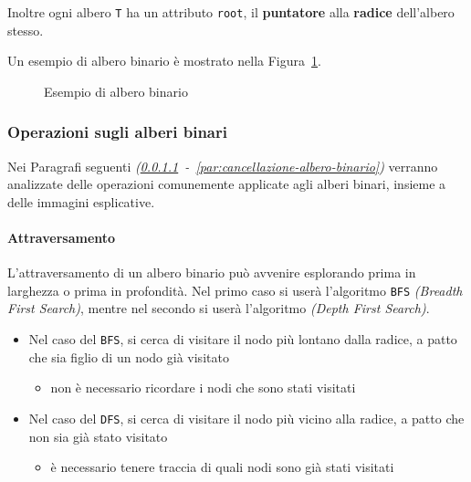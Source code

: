 \documentclass[italian, 10pt]{article}
\begin{document}
Inoltre ogni albero \texttt{T} ha un attributo \texttt{root}, il \textbf{puntatore} alla \textbf{radice} dell'albero stesso.

\bigskip
Un esempio di albero binario è mostrato nella Figura~\ref{fig:esempio-albero-binario}.

\begin{figure}[htbp]
  \bigskip
  \centering
  \caption{Esempio di albero binario}
  \label{fig:esempio-albero-binario}
  \bigskip
\end{figure}

\subsubsection{Operazioni sugli alberi binari}

Nei Paragrafi seguenti \textit{(\ref{attraversamento-albero-binario}~-~\ref{par:cancellazione-albero-binario})} verranno analizzate delle operazioni comunemente applicate agli alberi binari, insieme a delle immagini esplicative.

\paragraph{Attraversamento}
\label{attraversamento-albero-binario}

L'attraversamento di un albero binario può avvenire esplorando prima in larghezza o prima in profondità.
Nel primo caso si userà l'algoritmo \texttt{BFS} \textit{(Breadth First Search)}, mentre nel secondo si userà l'algoritmo \DFS \textit{(Depth First Search)}.

\begin{itemize}
  \item Nel caso del \texttt{BFS}, si cerca di visitare il nodo più lontano dalla radice, a patto che sia figlio di un nodo già visitato
        \begin{itemize}
          \item non è necessario ricordare i nodi che sono stati visitati
        \end{itemize}
  \item Nel caso del \texttt{DFS}, si cerca di visitare il nodo più vicino alla radice, a patto che non sia già stato visitato
        \begin{itemize}
          \item è necessario tenere traccia di quali nodi sono già stati visitati
        \end{itemize}
\end{itemize}
\end{document}
